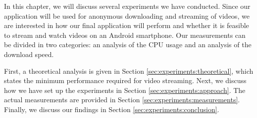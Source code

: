 In this chapter, we will discuss several experiments we have conducted. Since our application will be used for anonymous downloading and streaming of videos, we are interested in how our final application will perform and whether it is feasible to stream and watch videos on an Android smartphone. Our measurements can be divided in two categories: an analysis of the CPU usage and an analysis of the download speed.

First, a theoretical analysis is given in Section \ref{sec:experiments:theoretical}, which states the minimum performance required for video streaming. Next, we discuss how we have set up the experiments in Section \ref{sec:experiments:approach}. The actual measurements are provided in Section \ref{sec:experiments:measurements}. Finally, we discuss our findings in Section \ref{sec:experiments:conclusion}.
